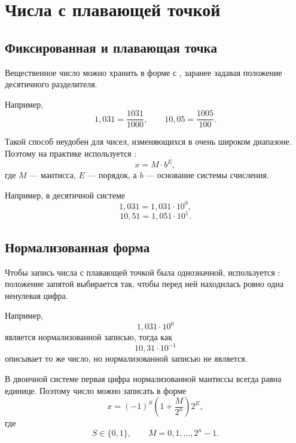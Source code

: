 \documentclass[../final.tex]{subfiles}
\begin{document}
\section{Числа с плавающей точкой}

\subsection{Фиксированная и плавающая точка}

Вещественное число можно хранить в форме с
, заранее задавая положение
десятичного разделителя.

Например,
%
\[
    1{,}031
    =
    \frac{1031}{1000},
    \qquad
    10{,}05
    =
    \frac{1005}{100}.
\]

Такой способ неудобен для чисел, изменяющихся в очень широком
диапазоне. Поэтому на практике используется
:
%
\begin{equation*}
    x
    =
    M\cdot b^E,
\end{equation*}
%
где $M$ --- мантисса, $E$ --- порядок, а $b$ --- основание
системы счисления.

Например, в десятичной системе
%
\[
    1{,}031
    =
    1{,}031\cdot10^0,
\]
%
\[
    10{,}51
    =
    1{,}051\cdot10^1.
\]


\subsection{Нормализованная форма}

Чтобы запись числа с плавающей точкой была однозначной,
используется : положение запятой
выбирается так, чтобы перед ней находилась ровно одна ненулевая
цифра.

Например,
%
\[
    1{,}031\cdot10^0
\]
%
является нормализованной записью, тогда как
%
\[
    10{,}31\cdot10^{-1}
\]
%
описывает то же число, но нормализованной записью не является.

В двоичной системе первая цифра нормализованной мантиссы всегда
равна единице. Поэтому число можно записать в форме
%
\begin{equation*}
    x
    =
    (-1)^S
    \left(
        1+\frac{M}{2^n}
    \right)
    2^E,
\end{equation*}
%
где
%
\[
    S\in\{0,1\},
    \qquad
    M=0,1,\ldots,2^n-1.
\]
\end{document}
